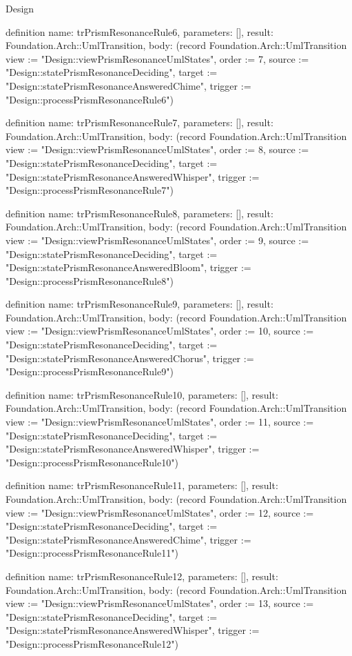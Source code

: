 \begin{lexlean}{Design}
\begin{semanticmodule}
definition{
  name: trPrismResonanceRule6,
  parameters: [],
  result: Foundation.Arch::UmlTransition,
  body: (record Foundation.Arch::UmlTransition {view := "Design::viewPrismResonanceUmlStates", order := 7, source := "Design::statePrismResonanceDeciding", target := "Design::statePrismResonanceAnsweredChime", trigger := "Design::processPrismResonanceRule6"})
}

definition{
  name: trPrismResonanceRule7,
  parameters: [],
  result: Foundation.Arch::UmlTransition,
  body: (record Foundation.Arch::UmlTransition {view := "Design::viewPrismResonanceUmlStates", order := 8, source := "Design::statePrismResonanceDeciding", target := "Design::statePrismResonanceAnsweredWhisper", trigger := "Design::processPrismResonanceRule7"})
}

definition{
  name: trPrismResonanceRule8,
  parameters: [],
  result: Foundation.Arch::UmlTransition,
  body: (record Foundation.Arch::UmlTransition {view := "Design::viewPrismResonanceUmlStates", order := 9, source := "Design::statePrismResonanceDeciding", target := "Design::statePrismResonanceAnsweredBloom", trigger := "Design::processPrismResonanceRule8"})
}

definition{
  name: trPrismResonanceRule9,
  parameters: [],
  result: Foundation.Arch::UmlTransition,
  body: (record Foundation.Arch::UmlTransition {view := "Design::viewPrismResonanceUmlStates", order := 10, source := "Design::statePrismResonanceDeciding", target := "Design::statePrismResonanceAnsweredChorus", trigger := "Design::processPrismResonanceRule9"})
}

definition{
  name: trPrismResonanceRule10,
  parameters: [],
  result: Foundation.Arch::UmlTransition,
  body: (record Foundation.Arch::UmlTransition {view := "Design::viewPrismResonanceUmlStates", order := 11, source := "Design::statePrismResonanceDeciding", target := "Design::statePrismResonanceAnsweredWhisper", trigger := "Design::processPrismResonanceRule10"})
}

definition{
  name: trPrismResonanceRule11,
  parameters: [],
  result: Foundation.Arch::UmlTransition,
  body: (record Foundation.Arch::UmlTransition {view := "Design::viewPrismResonanceUmlStates", order := 12, source := "Design::statePrismResonanceDeciding", target := "Design::statePrismResonanceAnsweredChime", trigger := "Design::processPrismResonanceRule11"})
}

definition{
  name: trPrismResonanceRule12,
  parameters: [],
  result: Foundation.Arch::UmlTransition,
  body: (record Foundation.Arch::UmlTransition {view := "Design::viewPrismResonanceUmlStates", order := 13, source := "Design::statePrismResonanceDeciding", target := "Design::statePrismResonanceAnsweredWhisper", trigger := "Design::processPrismResonanceRule12"})
}


\end{semanticmodule}
\end{lexlean}
